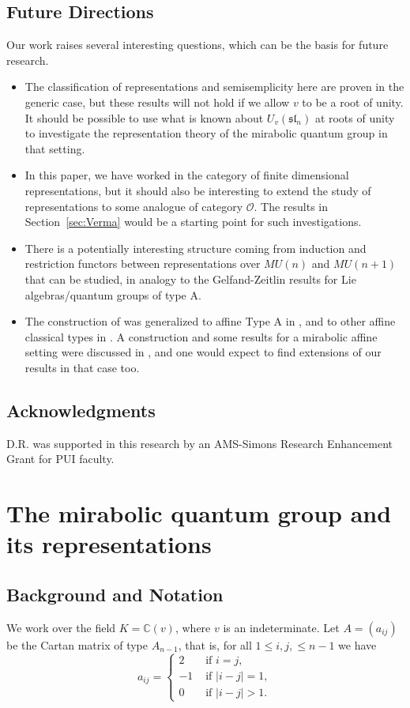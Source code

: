 \documentclass{amsart}
\numberwithin{equation}{section}
\theoremstyle{theorem}
\theoremstyle{definition}
\newcommand{\CC}{\mathbb{C}}
\newcommand{\oo}{\mathcal{O}}
\newcommand{\sll}{\mathfrak{sl}}
\newcommand{\uvsln}{U_v(\sll_n)}
\begin{document}
\subsection{Future Directions}
Our work raises several interesting questions, which can be the basis for future research.
\begin{itemize}
\item The classification of representations and semisemplicity here are proven in the generic case, but these results will not hold if we allow $v$ to be a root of unity. It should be possible to use what is known about $\uvsln$ at roots of unity to investigate the representation theory of the mirabolic quantum group in that setting.
\item In this paper, we have worked in the category of finite dimensional representations, but it should also be interesting to extend the study of representations to some analogue of category $\oo$. The results in Section~\ref{sec:Verma} would be a starting point for such investigations.
\item There is a potentially interesting structure coming from induction and restriction functors between representations over $MU(n)$ and $MU(n+1)$ that can be studied, in analogy to the Gelfand-Zeitlin results for Lie algebras/quantum groups of type A.
\item The construction of \cite{BLM} was generalized to affine Type A in \cite{GV93}, and to other affine classical types in \cite{FLLLW20}. A construction and some results for a mirabolic affine setting were discussed in \cite{RPhD}, and one would expect to find extensions of our results in that case too.
\end{itemize}

\subsection*{Acknowledgments}
D.R. was supported in this research by an AMS-Simons Research Enhancement Grant for PUI faculty.
\section{The mirabolic quantum group and its representations}\label{sec:mir-group-rep}
\subsection{Background and Notation}
We work over the field $K=\CC(v)$, where $v$ is an indeterminate. Let $A=(a_{ij})$ be the Cartan matrix of type $A_{n-1}$, that is, for all $1\leq i,j,\leq n-1$ we have
$$a_{ij}=\begin{cases} 2 & \text{ if }i=j, \\ -1 & \text{ if }|i-j|=1, \\ 0 & \text{ if }|i-j|>1.\end{cases}$$
\end{document}
